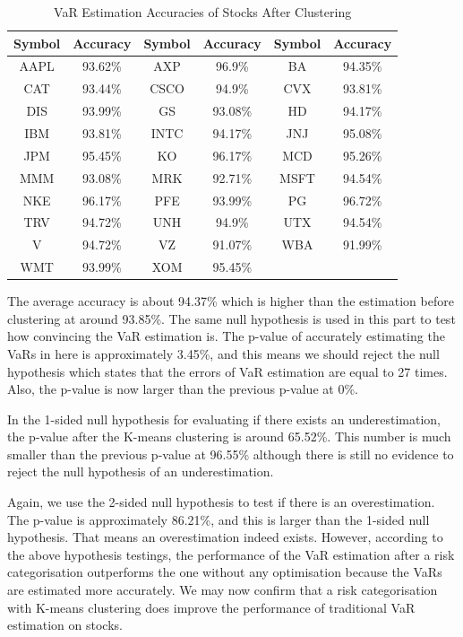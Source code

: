 \documentclass[11pt]{article} %
\theoremstyle{plain}
\theoremstyle{definition}
\begin{document}
{
  \begin{table}[ht]
    \centering
    \small
    \begin{tabular}{|c|c|c|c|c|c|}
        \hline
        Symbol & Accuracy & Symbol & Accuracy & Symbol & Accuracy \\
        \hline
        AAPL & \color{red}93.62\% & AXP & \color{red}96.9\% & BA & \color{red}94.35\% \\
        CAT & 93.44\% & CSCO & \color{red}94.9\% & CVX & 93.81\% \\
        DIS & \color{red}93.99\% & GS & 93.08\% & HD & \color{red}94.17\% \\
        IBM & 93.81\% & INTC & \color{red}94.17\% & JNJ & \color{red}95.08\% \\
        JPM & \color{red}95.45\% & KO & \color{red}96.17\% & MCD & \color{red}95.26\% \\
        MMM & 93.08\% & MRK & 92.71\% & MSFT & \color{red}94.54\% \\
        NKE & \color{red}96.17\% & PFE & 93.99\% & PG & \color{red}96.72\% \\
        TRV & \color{red}94.72\% & UNH & \color{red}94.9\% & UTX & \color{red}94.54\% \\
        V & \color{red}94.72\% & VZ & 91.07\% & WBA & 91.99\% \\
        WMT & 93.99\% & XOM & \color{red}95.45\% & & \\
        \hline
    \end{tabular}
    \caption{VaR Estimation Accuracies of Stocks After Clustering}
    \label{table:accstockafter}
  \end{table}
}

The average accuracy is about 94.37\% which is higher than the estimation before clustering at around 93.85\%. The same null hypothesis is used in this part to test how convincing the VaR estimation is. The p-value of accurately estimating the VaRs in here is approximately 3.45\%, and this means we should reject the null hypothesis which states that the errors of VaR estimation are equal to 27 times. Also, the p-value is now larger than the previous p-value at 0\%.

In the 1-sided null hypothesis for evaluating if there exists an underestimation, the p-value after the K-means clustering is around 65.52\%. This number is much smaller than the previous p-value at 96.55\% although there is still no evidence to reject the null hypothesis of an underestimation.

Again, we use the 2-sided null hypothesis to test if there is an overestimation. The p-value is approximately 86.21\%, and this is larger than the 1-sided null hypothesis. That means an overestimation indeed exists. However, according to the above hypothesis testings, the performance of the VaR estimation after a risk categorisation outperforms the one without any optimisation because the VaRs are estimated more accurately. We may now confirm that a risk categorisation with K-means clustering does improve the performance of traditional VaR estimation on stocks.
\end{document}

